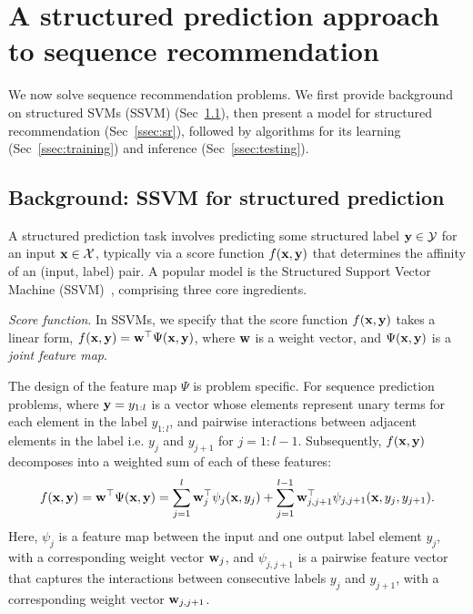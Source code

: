 \secmoveup
\section{A structured prediction approach to sequence recommendation}
\label{sec:recseq}
\textmoveup

We now %
solve sequence recommendation problems. %
We first provide background on structured SVMs (SSVM) (Sec~\ref{ssec:ssvm}),
then present a model for structured recommendation (Sec~\ref{ssec:sr}),
followed by  algorithms for its learning (Sec~\ref{ssec:training}) 
and inference (Sec~\ref{ssec:testing}).


\secmoveup
\subsection{Background: SSVM for structured prediction}
\label{ssec:ssvm}
\textmoveup

A structured prediction task involves predicting some structured label $\mathbf{y} \in \mathcal{Y}$ for an input $\mathbf{x} \in \mathcal{X}$,
typically via a score function $f(\mathbf{x},\mathbf{y})$ that determines the affinity of an (input, label) pair.
A popular model is the Structured Support Vector Machine (SSVM)~\cite{joachims2009predicting,tsochantaridis2005large}, comprising three core ingredients.

\emph{Score function}. In SSVMs, we specify that the score function $f(\mathbf{x}, \mathbf{y})$ takes a linear form, \ie 
$f(\mathbf{x}, \mathbf{y}) = \mathbf{w}^\top \Psi(\mathbf{x}, \mathbf{y})$,
where $\mathbf{w}$ is a weight vector, and $\Psi(\mathbf{x}, \mathbf{y})$ is a \emph{joint feature map}.

The design of the feature map $\Psi$ is problem specific.
For sequence prediction problems,
where $\mathbf{y} = y_{1 : l}$
is a vector whose elements represent unary
terms for each element in the label $y_{1:l}$, and pairwise interactions between
adjacent
elements in the label
i.e. $y_j$ and $y_{j+1}$ for $j=1 : l \!-\! 1$.
Subsequently, $f(\mathbf{x},\mathbf{y})$ decomposes into a weighted sum of
each of these features: %
\begin{equation}
\label{eq:jointfeature}
f(\x, \y) = \w^\top \Psi(\x, \y) = 
\sum_{j=1}^l \w_j^\top \psi_j(\x, y_j) + \sum_{j=1}^{l-1} \w_{j,j+1}^\top \psi_{j,j+1}(\x, y_{j}, y_{j+1}).
\eqmoveup
\end{equation}
Here, $\psi_j$ is a feature map between the input and one output label element $y_j$, with a corresponding weight vector $\mathbf{w}_j$,
and $\psi_{j,j+1}$ is a pairwise feature vector that captures the interactions between consecutive labels $y_j$ and $y_{j+1}$,
with a corresponding weight vector $\mathbf{w}_{j,j+1}$.

